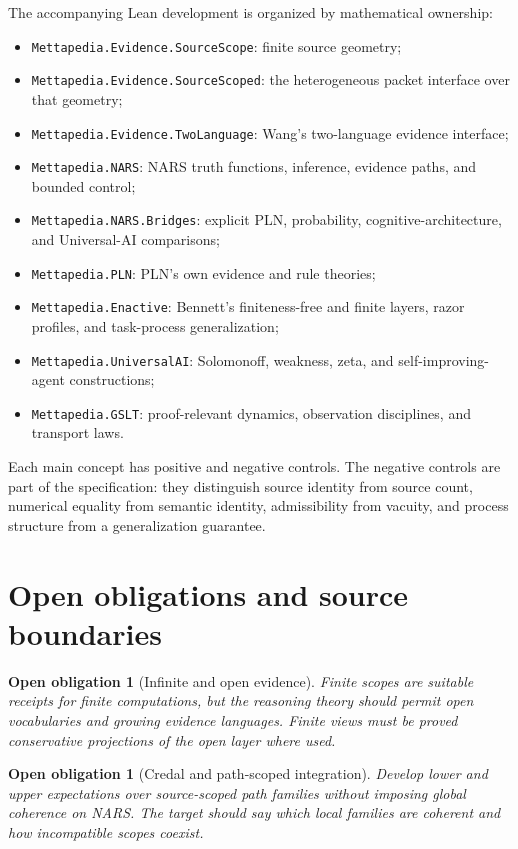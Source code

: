 \documentclass[11pt]{article}
\newtheorem{obligation}[definition]{Open obligation}
\theoremstyle{remark}
\begin{document}
The accompanying Lean development is organized by mathematical ownership:
\begin{itemize}
  \item \texttt{Mettapedia.Evidence.SourceScope}: finite source geometry;
  \item \texttt{Mettapedia.Evidence.SourceScoped}: the heterogeneous packet
        interface over that geometry;
  \item \texttt{Mettapedia.Evidence.TwoLanguage}: Wang's two-language evidence
        interface;
  \item \texttt{Mettapedia.NARS}: NARS truth functions, inference, evidence
        paths, and bounded control;
  \item \texttt{Mettapedia.NARS.Bridges}: explicit PLN, probability,
        cognitive-architecture, and Universal-AI comparisons;
  \item \texttt{Mettapedia.PLN}: PLN's own evidence and rule theories;
  \item \texttt{Mettapedia.Enactive}: Bennett's finiteness-free and finite
        layers, razor profiles, and task-process generalization;
  \item \texttt{Mettapedia.UniversalAI}: Solomonoff, weakness, zeta, and
        self-improving-agent constructions;
  \item \texttt{Mettapedia.GSLT}: proof-relevant dynamics, observation
        disciplines, and transport laws.
\end{itemize}

Each main concept has positive and negative controls.  The negative controls
are part of the specification: they distinguish source identity from source
count, numerical equality from semantic identity, admissibility from vacuity,
and process structure from a generalization guarantee.

\section{Open obligations and source boundaries}

\begin{obligation}[Infinite and open evidence]
Finite scopes are suitable receipts for finite computations, but the reasoning
theory should permit open vocabularies and growing evidence languages.  Finite
views must be proved conservative projections of the open layer where used.
\end{obligation}

\begin{obligation}[Credal and path-scoped integration]
Develop lower and upper expectations over source-scoped path families without
imposing global coherence on NARS.  The target should say which local families
are coherent and how incompatible scopes coexist.
\end{obligation}
\end{document}
